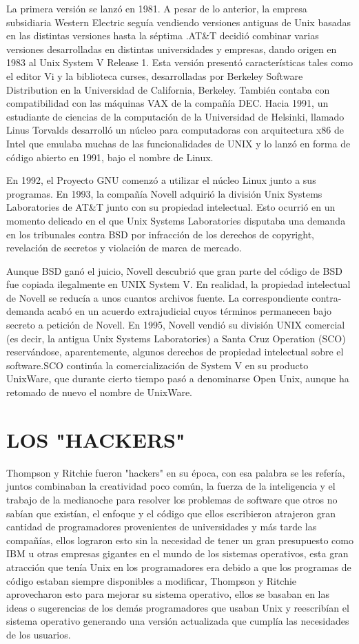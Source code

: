 La primera versión se lanzó en 1981. A pesar de lo anterior, la empresa subsidiaria Western Electric seguía vendiendo versiones antiguas de Unix basadas en las distintas 
versiones hasta la séptima .AT\&T decidió combinar varias versiones desarrolladas en distintas universidades y empresas, dando origen en 1983 al Unix System V Release 1. Esta 
versión presentó características tales como el editor Vi y la biblioteca curses, desarrolladas por Berkeley Software Distribution en la Universidad de California, Berkeley. 
También contaba con compatibilidad con las máquinas VAX de la compañía DEC. Hacia 1991, un estudiante de ciencias de la computación de la Universidad de Helsinki, llamado Linus 
Torvalds desarrolló un núcleo para computadoras con arquitectura x86 de Intel que emulaba muchas de las funcionalidades de UNIX y lo lanzó en forma de código abierto en 1991, 
bajo el nombre de Linux.
 
En 1992, el Proyecto GNU comenzó a utilizar el núcleo Linux junto a sus programas. En 1993, la compañía Novell adquirió la división Unix Systems Laboratories de AT\&T junto con 
su propiedad intelectual. Esto ocurrió en un momento delicado en el que Unix Systems Laboratories disputaba una demanda en los tribunales contra BSD por infracción de los 
derechos de copyright, revelación de secretos y violación de marca de mercado.
 
Aunque BSD ganó el juicio, Novell descubrió que gran parte del código de BSD fue copiada ilegalmente en UNIX System V. En realidad, la propiedad intelectual de Novell se reducía 
a unos cuantos archivos fuente. La correspondiente contra-demanda acabó en un acuerdo extrajudicial cuyos términos permanecen bajo secreto a petición de Novell. En 1995, Novell 
vendió su división UNIX comercial (es decir, la antigua Unix Systems Laboratories) a Santa Cruz Operation (SCO) reservándose, aparentemente, algunos derechos de propiedad 
intelectual sobre el software.SCO continúa la comercialización de System V en su producto UnixWare, que durante cierto tiempo pasó a denominarse Open Unix, aunque ha retomado de 
nuevo el nombre de UnixWare.


\section*{LOS "HACKERS"}
Thompson y Ritchie fueron "hackers" en su época, con esa palabra se les refería, juntos combinaban la creatividad poco común, la fuerza de la inteligencia y el trabajo de 
la medianoche para resolver los problemas de software que otros no sabían que existían, el enfoque y el código que ellos escribieron atrajeron gran cantidad de 
programadores provenientes de universidades y más tarde las  compañías, ellos lograron esto sin la necesidad de tener un gran presupuesto como IBM u otras empresas 
gigantes en el mundo de los sistemas operativos,  esta gran atracción que tenía Unix en los programadores era debido a que los programas de código estaban siempre  
disponibles a modificar, Thompson y Ritchie aprovecharon esto para mejorar su sistema operativo, ellos se basaban en las ideas o sugerencias de los demás programadores que 
usaban Unix y reescribían el sistema operativo generando una versión actualizada que cumplía las necesidades de los usuarios.


